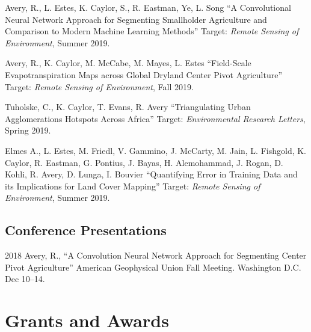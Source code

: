 \documentclass[12pt,letterpaper]{report}
\begin{document}
	\begin{tablist}
				
		\item[\the\year] \tab Avery, R., L. Estes, K. Caylor, S., R. Eastman, Ye, L. Song \enquote{A Convolutional Neural Network Approach for Segmenting Smallholder Agriculture and Comparison to Modern Machine Learning Methods} Target: \textit{Remote Sensing of Environment}, Summer 2019.
		
		\item[\the\year] \tab Avery, R., K. Caylor, M. McCabe, M. Mayes, L. Estes \enquote{Field-Scale Evapotranspiration Maps across Global Dryland Center Pivot Agriculture} Target: \textit{Remote Sensing of Environment}, Fall 2019.
		
		\item[\the\year] \tab Tuholske, C., K. Caylor, T. Evans, R. Avery \enquote{Triangulating Urban Agglomerations Hotspots Across Africa} Target: \textit{Environmental Research Letters}, Spring 2019.

	        \item[\the\year] \tab Elmes A., L. Estes, M. Friedl, V. Gammino, J. McCarty, M. Jain, L. Fishgold, K. Caylor, R. Eastman, G. Pontius, J. Bayas, H. Alemohammad, J. Rogan, D. Kohli, R. Avery, D. Lunga, I. Bouvier   \enquote{Quantifying Error in Training Data and its Implications for Land Cover Mapping} Target: \textit{Remote Sensing of Environment}, Summer 2019.
	
	\end{tablist}
	

	\subsection*{Conference Presentations}
	
	\begin{tablist}
		
		\item[2018] \tab Avery, R.,  \enquote{A Convolution Neural Network Approach for Segmenting Center Pivot Agriculture} American Geophysical Union Fall Meeting. Washington D.C. Dec 10--14.
						
	\end{tablist}
	
	
	
	\section*{Grants and Awards}
	
\end{document}

